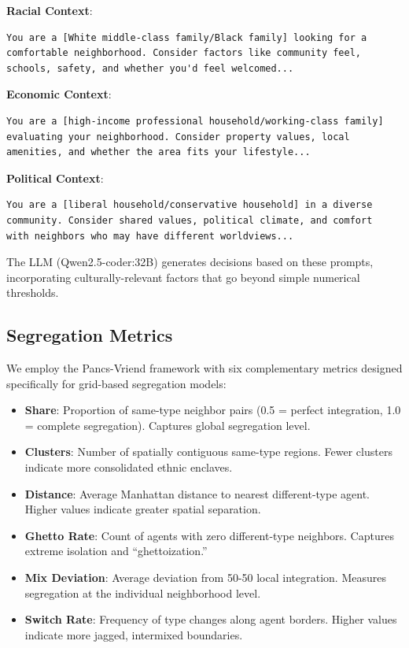 \documentclass[pdflatex,sn-basic]{sn-jnl}%
\providecommand{\tightlist}{%
  \setlength{\itemsep}{0pt}\setlength{\parskip}{0pt}}
\begin{document}
\textbf{Racial Context}:
\begin{verbatim}
You are a [White middle-class family/Black family] looking for a 
comfortable neighborhood. Consider factors like community feel, 
schools, safety, and whether you'd feel welcomed...
\end{verbatim}

\textbf{Economic Context}:
\begin{verbatim}
You are a [high-income professional household/working-class family] 
evaluating your neighborhood. Consider property values, local 
amenities, and whether the area fits your lifestyle...
\end{verbatim}

\textbf{Political Context}:
\begin{verbatim}
You are a [liberal household/conservative household] in a diverse 
community. Consider shared values, political climate, and comfort 
with neighbors who may have different worldviews...
\end{verbatim}

The LLM (Qwen2.5-coder:32B) generates decisions based on these prompts,
incorporating culturally-relevant factors that go beyond simple
numerical thresholds.

\subsection{Segregation Metrics}\label{segregation-metrics}

We employ the Pancs-Vriend framework \citep{pancs2007schelling} with
six complementary metrics designed specifically for grid-based
segregation models:

\begin{itemize}
\tightlist
\item
  \textbf{Share}: Proportion of same-type neighbor pairs (0.5 = perfect
  integration, 1.0 = complete segregation). Captures global segregation
  level.
\item
  \textbf{Clusters}: Number of spatially contiguous same-type regions.
  Fewer clusters indicate more consolidated ethnic enclaves.
\item
  \textbf{Distance}: Average Manhattan distance to nearest
  different-type agent. Higher values indicate greater spatial
  separation.
\item
  \textbf{Ghetto Rate}: Count of agents with zero different-type
  neighbors. Captures extreme isolation and ``ghettoization.''
\item
  \textbf{Mix Deviation}: Average deviation from 50-50 local
  integration. Measures segregation at the individual neighborhood
  level.
\item
  \textbf{Switch Rate}: Frequency of type changes along agent borders.
  Higher values indicate more jagged, intermixed boundaries.
\end{itemize}
\end{document}
